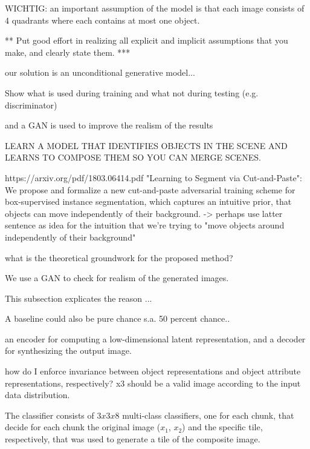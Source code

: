 \documentclass[11pt,a4paper]{article}
\begin{document}
\par WICHTIG: an important assumption of the model is that each image consists of 4 quadrants where each contains at most one object.

\par ***
Put good effort in realizing
all explicit and implicit assumptions that you make, and
clearly state them.
***

\par our solution is an unconditional generative model...

\par Show what is used during training and what not during testing (e.g. discriminator)

\par and a GAN is used to improve the realism of the results

\par LEARN A MODEL THAT IDENTIFIES OBJECTS IN THE SCENE AND LEARNS TO COMPOSE THEM SO YOU CAN MERGE SCENES.

\par https://arxiv.org/pdf/1803.06414.pdf "Learning to Segment via Cut-and-Paste": We propose and formalize a new cut-and-paste adversarial training scheme for box-supervised instance segmentation, which captures an intuitive prior, that objects can move independently of their background.
-> perhaps use latter sentence as idea for the intuition that we're trying to "move objects around independently of their background"

\par what is the theoretical groundwork for the proposed method?

\par We use a GAN to check for realism of the generated images.

\par This subsection explicates the reason ...

\par A baseline could also be pure chance s.a. 50 percent chance..

\par an encoder for computing a low-dimensional latent representation, and a decoder for synthesizing the output image.

how do I enforce invariance between object representations and object attribute representations, respectively?
x3 should be a valid image according to the input data distribution.

The classifier consists of $3x3x8$ multi-class classifiers, one for each chunk, that decide for each chunk the original image ($x_1$, $x_2$) and the specific tile, respectively, that was used to generate a tile of the composite image.
\end{document}
